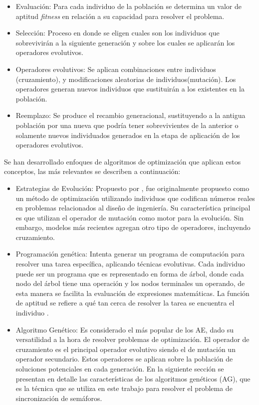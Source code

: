 \begin{itemize}
	\item Evaluación: Para cada individuo de la población se determina un valor de aptitud \emph{fitness} en relación a su capacidad para resolver el problema. 
	\item Selección: Proceso en donde se eligen cuales son los individuos que sobrevivirán a la siguiente generación y sobre los cuales se aplicarán los operadores evolutivos.
	\item Operadores evolutivos: Se aplican combinaciones entre individuos (cruzamiento), y modificaciones aleatorias de individuos(mutación). Los operadores generan nuevos individuos que sustituirán a los existentes en la población.
	\item Reemplazo: Se produce el recambio generacional, sustituyendo a la antigua población por una nueva que podría tener sobrevivientes de la anterior o solamente nuevos individuados generados en la etapa de aplicación de los operadores evolutivos.
\end{itemize}

Se han desarrollado enfoques de algoritmos de optimización que aplican estos conceptos, las más relevantes se describen a continuación:

\begin{itemize}

	\item Estrategias de Evolución: Propuesto por \citet{Ingo1971}, fue originalmente propuesto como un método de optimización utilizando individuos que codifican números reales en problemas relacionados al diseño de ingeniería. Su característica principal es que utilizan el operador de mutación como motor para la evolución. Sin embargo, modelos más recientes agregan otro tipo de operadores, incluyendo cruzamiento.
	\item Programación genética: Intenta generar un programa de computación para resolver una tarea específica, aplicando técnicas evolutivas. Cada individuo puede ser un programa que es representado en forma de árbol, donde cada nodo del árbol tiene una operación y los nodos terminales un operando, de esta manera se facilita la evaluación de expresiones matemáticas. La función de aptitud se refiere a qué tan cerca de resolver la tarea se encuentra el individuo \citep{Koza1992}.
	\item Algoritmo Genético: Es considerado el más popular de los AE, dado su versatilidad a la hora de resolver problemas de optimización. El operador de cruzamiento es el principal operador evolutivo siendo el de mutación un operador secundario. Estos operadores se aplican sobre la población de soluciones potenciales en cada generación. En la siguiente sección se presentan en detalle las características de los algoritmos genéticos (AG), que es la técnica que se utiliza en este trabajo para resolver el problema de sincronización de semáforos.
	
\end{itemize}

